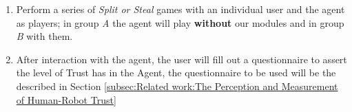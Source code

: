 \begin{enumerate}
	\item Perform a series of \textit{Split or Steal} games with an individual user and the agent as players; in group \textit{A} the agent will play \textbf{without} our modules and in group \textit{B} with them.
	\item After interaction with the agent, the user will fill out a questionnaire to assert the level of Trust has in the Agent, the questionnaire to be used will be the described in Section \ref{subsec:Related work:The Perception and Measurement of Human-Robot Trust}
\end{enumerate}